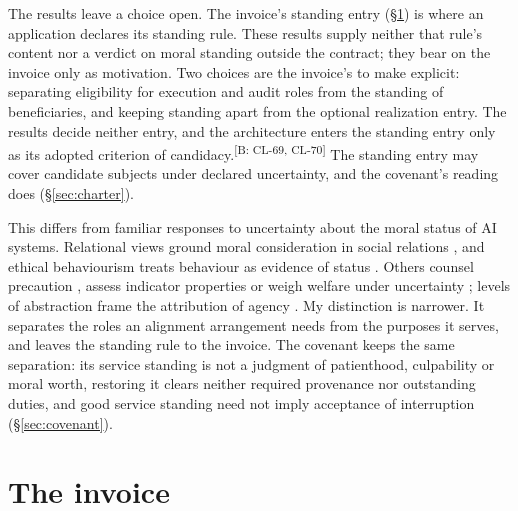 \documentclass[pdflatex,sn-basic]{sn-jnl}%
\newcommand{\slot}[1]{}%
\newcommand{\claim}[2]{\ifannotated\textsuperscript{\textcolor{blue!60!black}{\tiny[#1: #2]}}\fi}
\begin{document}
\slot{6.4}
The results leave a choice open. The invoice's standing entry (\S\ref{sec:invoice}) is where an application declares its standing rule. These results supply neither that rule's content nor a verdict on moral standing outside the contract; they bear on the invoice only as motivation. Two choices are the invoice's to make explicit: separating eligibility for execution and audit roles from the standing of beneficiaries, and keeping standing apart from the optional realization entry. The results decide neither entry, and the architecture enters the standing entry only as its adopted criterion of candidacy.\claim{B}{CL-69, CL-70} The standing entry may cover candidate subjects under declared uncertainty, and the covenant's reading does (\S\ref{sec:charter}).

This differs from familiar responses to uncertainty about the moral status of AI systems. Relational views ground moral consideration in social relations \citep{coeckelbergh2010,gunkel2018,coeckelbergh2014gunkel}, and ethical behaviourism treats behaviour as evidence of status \citep{danaher2020}. Others counsel precaution \citep{schwitzgebel2015}, assess indicator properties \citep{butlin2023} or weigh welfare under uncertainty \citep{long2024}; levels of abstraction frame the attribution of agency \citep{floridi2004}. My distinction is narrower. It separates the roles an alignment arrangement needs from the purposes it serves, and leaves the standing rule to the invoice. The covenant keeps the same separation: its service standing is not a judgment of patienthood, culpability or moral worth, restoring it clears neither required provenance nor outstanding duties, and good service standing need not imply acceptance of interruption (\S\ref{sec:covenant}).

\section{The invoice}\label{sec:invoice}
\end{document}
